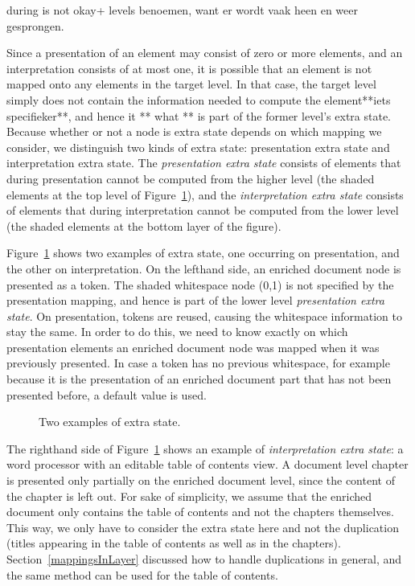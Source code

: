 \bc
during is not okay+ levels benoemen, want er wordt vaak heen en weer gesprongen.

Since a presentation of an element may consist of zero or more elements, and an interpretation consists of at most one, it is possible that an element is not mapped onto any elements in the target level. In that case, the target level simply does not contain the information needed to compute the element**iets specifieker**, and hence it ** what ** is part of the former level's extra state. Because whether or not a node is extra state depends on which mapping we consider, we distinguish two kinds of extra state: presentation extra state and interpretation extra state. The {\em presentation extra state} consists of elements that during presentation cannot be computed from the higher level (the shaded elements at the top level of Figure~\ref{layerExtraState}), and the {\em interpretation extra state} consists of elements that during interpretation cannot be computed from the lower level (the shaded elements at the bottom layer of the figure).
\ec


Figure~\ref{layerExtraState} shows two examples of extra state, one occurring on presentation, and the other on interpretation. On the lefthand side, an enriched document node is presented as a token. The shaded whitespace node (0,1) is not specified by the presentation mapping, and hence is part of the lower level {\em presentation extra state}. On presentation, tokens are reused, causing the whitespace information to stay the same. In order to do this, we need to know exactly on which presentation elements an enriched document node was mapped when it was previously presented. In case a token has no previous whitespace, for example because it is the presentation of an enriched document part that has not been presented before, a default value is used.

\begin{figure}
\begin{center}
\begin{center}
\end{center}
\caption{Two examples of extra state.} \label{layerExtraState} 
\end{center}
\end{figure}


The righthand side of Figure~\ref{layerExtraState} shows an example of {\em interpretation extra state}: a word processor with an editable table of contents view. A document level chapter is presented only partially on the enriched document level, since the content of the chapter is left out. For sake of simplicity, we assume that the enriched document only contains the table of contents and not the chapters themselves. This way, we only have to consider the extra state here and not the duplication (titles appearing in the table of contents as well as in the chapters). Section~\ref{mappingsInLayer} discussed how to handle duplications in general, and the same method can be used for the table of contents.

